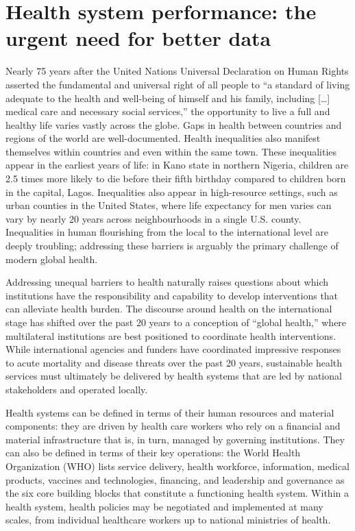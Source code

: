 \documentclass[
]{report}
\begin{document}

\hypertarget{health-system-performance-the-urgent-need-for-better-data}{%
\section{Health system performance: the urgent need for better data}\label{health-system-performance-the-urgent-need-for-better-data}}

Nearly 75 years after the United Nations Universal Declaration on Human Rights asserted the fundamental and universal right of all people to ``a standard of living adequate to the health and well-being of himself and his family, including {[}\ldots{]} medical care and necessary social services,''\autocite{srs} the opportunity to live a full and healthy life varies vastly across the globe. Gaps in health between countries and regions of the world are well-documented. Health inequalities also manifest themselves within countries and even within the same town. These inequalities appear in the earliest years of life: in Kano state in northern Nigeria, children are 2.5 times more likely to die before their fifth birthday compared to children born in the capital, Lagos.\autocite{Burstein2019} Inequalities also appear in high-resource settings, such as urban counties in the United States, where life expectancy for men varies can vary by nearly 20 years across neighbourhoods in a single U.S. county.\autocite{Dwyer-Lindgren2017} Inequalities in human flourishing from the local to the international level are deeply troubling; addressing these barriers is arguably the primary challenge of modern global health.\autocite{Ruger2006}

Addressing unequal barriers to health naturally raises questions about which institutions have the responsibility and capability to develop interventions that can alleviate health burden. The discourse around health on the international stage has shifted over the past 20 years to a conception of ``global health,'' where multilateral institutions are best positioned to coordinate health interventions.\autocite{Brown2006} While international agencies and funders have coordinated impressive responses to acute mortality and disease threats over the past 20 years, sustainable health services must ultimately be delivered by health systems that are led by national stakeholders and operated locally.\autocite{WorldHealthOrganization2007,WorldHealthOrganization2010}

Health systems can be defined in terms of their human resources and material components: they are driven by health care workers who rely on a financial and material infrastructure that is, in turn, managed by governing institutions.\autocite{Roberts2008} They can also be defined in terms of their key operations: the World Health Organization (WHO) lists service delivery, health workforce, information, medical products, vaccines and technologies, financing, and leadership and governance as the six core building blocks that constitute a functioning health system.\autocite{WorldHealthOrganization2007} Within a health system, health policies may be negotiated and implemented at many scales, from individual healthcare workers up to national ministries of health.
\end{document}

